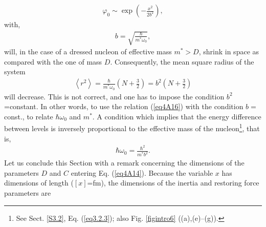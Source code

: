 \begin{align}\label{eq4A15}
\varphi_0\sim\exp\left(-\frac{x^2}{2b^2}\right),
\end{align}
with,
\begin{align}\label{eq4A16}
b=\sqrt{\frac{\hbar}{m^*\omega_0}},
\end{align}
will, in the case of a dressed nucleon of effective mass $m^*>D$,  shrink in space as compared with the one of mass $D$. Consequently, the mean square radius of the system
\begin{align}\label{eq4A17}
\left\langle r^2\right\rangle=\frac{\hbar}{m^*\omega_0}\left(N+\frac{3}{2}\right)=b^2\left(N+\frac{3}{2}\right)
\end{align}
will decrease. This is not correct, and one has to impose the condition $b^2$=constant. In other words, to use the relation (\ref{eq4A16}) with the condition $b=$const.,  to relate $\hbar\omega_0$ and $m^*$. A condition which implies that the energy difference between levels is inversely proportional to the effective mass of the nucleon\footnote{See Sect. \ref{S3.2}, Eq. (\ref{eq3.2.3}); also Fig. \ref{figintro6} ((a),(e)--(g)).}, that is,
\begin{align}\label{eq4A18x}
\hbar\omega_0=\frac{\hbar^2}{m^*b^2}.
\end{align}
Let us conclude this Section with a remark concerning the dimensions of the parameters $D$ and $C$ entering Eq. (\ref{eq4A14}). Because the variable $x$ has dimensions of length ($[x]$=fm), the dimensions of the inertia and restoring force parameters are


